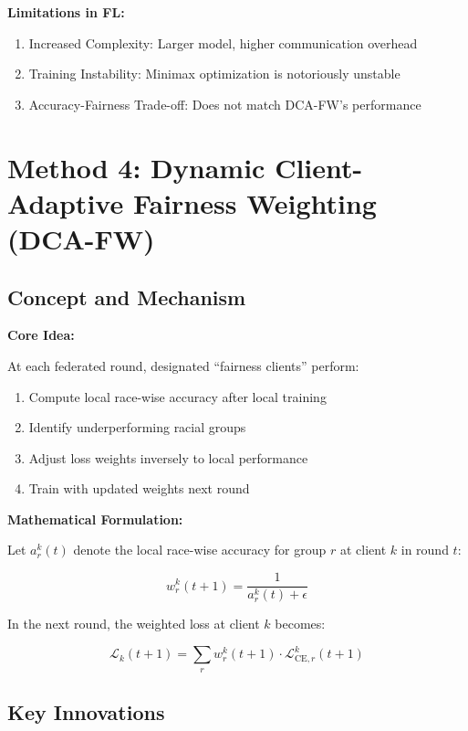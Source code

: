 \documentclass[11pt,a4paper]{report}
\begin{document}
\textbf{Limitations in FL:}
\begin{enumerate}
    \item Increased Complexity: Larger model, higher communication overhead
    \item Training Instability: Minimax optimization is notoriously unstable
    \item Accuracy-Fairness Trade-off: Does not match DCA-FW's performance
\end{enumerate}

\section{Method 4: Dynamic Client-Adaptive Fairness Weighting (DCA-FW)}

\subsection{Concept and Mechanism}

\textbf{Core Idea:}

At each federated round, designated ``fairness clients'' perform:
\begin{enumerate}
    \item Compute local race-wise accuracy after local training
    \item Identify underperforming racial groups
    \item Adjust loss weights inversely to local performance
    \item Train with updated weights next round
\end{enumerate}

\textbf{Mathematical Formulation:}

Let $a_r^k(t)$ denote the local race-wise accuracy for group $r$ at client $k$ in round $t$:

\begin{equation}
w_r^k(t+1) = \frac{1}{a_r^k(t) + \epsilon}
\end{equation}

In the next round, the weighted loss at client $k$ becomes:

\begin{equation}
\mathcal{L}_k(t+1) = \sum_{r} w_r^k(t+1) \cdot \mathcal{L}_{\text{CE},r}^k(t+1)
\end{equation}

\subsection{Key Innovations}
\end{document}
